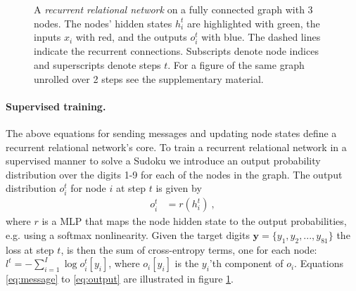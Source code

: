 \documentclass{article}
\newcommand{\ulrich}[1]{

}
\begin{document}
\begin{figure}[t]
\centering

\caption{A \emph{recurrent relational network} on a fully connected graph with 3 nodes.
The nodes' hidden states $h_i^t$ are highlighted with green, the inputs $x_i$ with red, and the outputs $o_i^t$ with blue. The dashed lines indicate the recurrent connections.
Subscripts denote node indices and superscripts denote steps $t$.
For a figure of the same graph unrolled over 2 steps see the supplementary material. \label{fig:simple-graph}}
\end{figure}

\paragraph{Supervised training.}
The above equations for sending messages and updating node states define a recurrent relational network's core. To train a recurrent relational network in a supervised manner to solve a Sudoku we introduce an output probability distribution over the digits 1-9 for each of the nodes in the graph.
The output distribution $o_i^t$ for node $i$ at step $t$ is given by
%
\begin{align}
    \label{eq:output}
    o_i^t &= r\left(h_i^t\right) \ ,
\end{align}
%
where $r$ is a MLP that maps the node hidden state to the output probabilities, e.g. using a softmax nonlinearity. Given the target digits $\mathbf{y} = \{y_1, y_2, ..., y_{81}\}$ the loss at step $t$, is then the sum of cross-entropy terms, one for each node: $l^t =  -\sum_{i=1}^{I} \log o_i^t\left[ y_i \right]$, where $o_i[y_i]$ is the $y_i$'th component of $o_i$.
Equations \eqref{eq:message} to \eqref{eq:output}
are illustrated in figure \ref{fig:simple-graph}.



%
%
%
%
\end{document}
